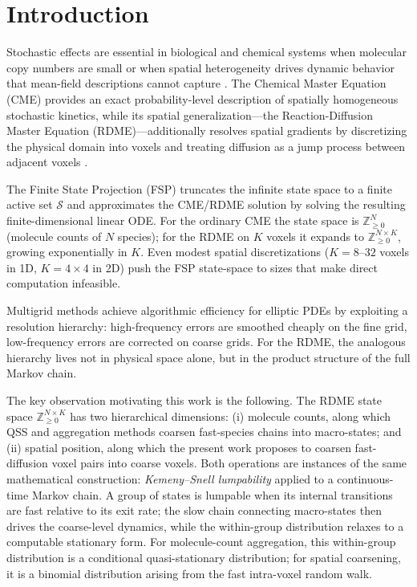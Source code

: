 \documentclass[review,onefignum,onetabnum]{siamart171218}
\newcommand{\Znn}{\mathbb{Z}_{\geq 0}}
\begin{document}
\section{Introduction}
\label{sec:intro}

Stochastic effects are essential in biological and chemical
systems when molecular copy numbers are small or when spatial
heterogeneity drives dynamic behavior that mean-field
descriptions cannot capture \cite{Gillespie1977}.  The Chemical
Master Equation (CME) provides an exact probability-level
description of spatially homogeneous stochastic kinetics, while
its spatial generalization---the Reaction-Diffusion Master
Equation (RDME)---additionally resolves spatial gradients by
discretizing the physical domain into voxels and treating
diffusion as a jump process between adjacent voxels
\cite{Erban2009}.

The Finite State Projection (FSP) \cite{Munsky2006} truncates the
infinite state space to a finite active set $\mathcal{S}$ and
approximates the CME/RDME solution by solving the resulting
finite-dimensional linear ODE.  For the ordinary CME the state
space is $\Znn^N$ (molecule counts of $N$ species); for the RDME
on $K$ voxels it expands to $\Znn^{N \times K}$, growing
exponentially in $K$.  Even modest spatial discretizations
($K = 8$--$32$ voxels in 1D, $K = 4 \times 4$ in 2D) push the
FSP state-space to sizes that make direct computation
infeasible.

Multigrid methods \cite{Briggs2000,Trottenberg2001} achieve
algorithmic efficiency for elliptic PDEs by exploiting a
resolution hierarchy: high-frequency errors are smoothed cheaply
on the fine grid, low-frequency errors are corrected on coarse
grids.  For the RDME, the analogous hierarchy lives not in
physical space alone, but in the product structure of the full
Markov chain.

The key observation motivating this work is the following.
The RDME state space $\Znn^{N \times K}$ has two hierarchical
dimensions: (i) molecule counts, along which QSS and
aggregation methods \cite{peles,CAO20083472} coarsen fast-species
chains into macro-states; and (ii) spatial position, along which
the present work proposes to coarsen fast-diffusion voxel pairs
into coarse voxels.  Both operations are instances of the same
mathematical construction: \emph{Kemeny--Snell lumpability}
\cite{kemeny_snell_1960} applied to a continuous-time Markov chain.
A group of states is lumpable when its internal transitions are
fast relative to its exit rate; the slow chain connecting
macro-states then drives the coarse-level dynamics, while the
within-group distribution relaxes to a computable stationary
form.  For molecule-count aggregation, this within-group
distribution is a conditional quasi-stationary distribution; for
spatial coarsening, it is a binomial distribution arising from
the fast intra-voxel random walk.
\end{document}

